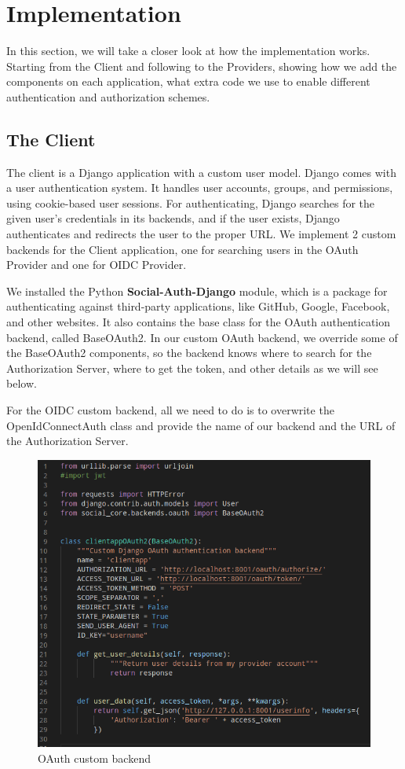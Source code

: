 \section{Implementation}

In this section, we will take a closer look at how the implementation works. Starting from the Client and following to the Providers, showing how we add the components on each application, what extra code we use to enable different authentication and authorization schemes.

\subsection{The Client}

The client is a Django application with a custom user model. Django comes with a user authentication system. It handles user accounts, groups, and permissions, using cookie-based user sessions. For authenticating, Django searches for the given user's credentials in its backends, and if the user exists, Django authenticates and redirects the user to the proper URL. We implement 2 custom backends for the Client application, one for searching users in the OAuth Provider and one for OIDC Provider.

We installed the Python \textbf{Social-Auth-Django} \cite{djangosocial} module, which is a package for authenticating against third-party applications, like GitHub, Google, Facebook, and other websites. It also contains the base class for the OAuth authentication backend, called BaseOAuth2. In our custom OAuth backend, we override some of the BaseOAuth2 components, so the backend knows where to search for the Authorization Server, where to get the token, and other details as we will see below.

For the OIDC custom backend, all we need to do is to overwrite the OpenIdConnectAuth class and provide the name of our backend and the URL of the Authorization Server.


\begin{figure}[htb]
	\centering
	\includegraphics[scale=0.5]{figures/clientapp.png}
	\caption{OAuth custom backend}
\end{figure}


